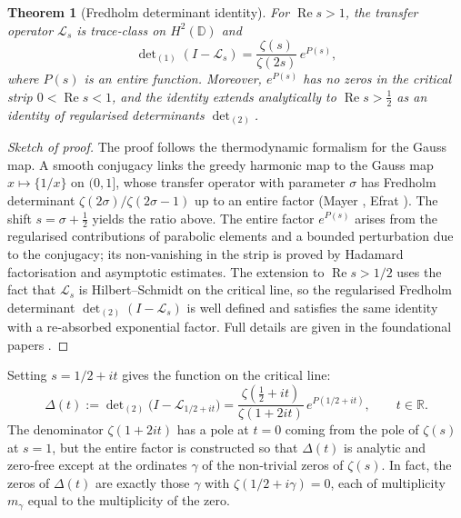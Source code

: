 \documentclass[11pt,a4paper]{article}
\newtheorem{theorem}{Theorem}[section]
\theoremstyle{definition}
\theoremstyle{remark}
\newcommand{\bbR}{\mathbb{R}}
\begin{document}
\begin{theorem}[Fredholm determinant identity]\label{thm:det}
For \(\operatorname{Re}s > 1\), the transfer operator \(\mathcal{L}_s\) is trace‑class on \(H^2(\mathbb{D})\) and
\begin{equation}\label{eq:detid}
\det\nolimits_{(1)}(I - \mathcal{L}_s) = \frac{\zeta(s)}{\zeta(2s)}\, e^{P(s)},
\end{equation}
where \(P(s)\) is an entire function.  Moreover, \(e^{P(s)}\) has no zeros in the critical strip \(0<\operatorname{Re}s<1\), and the identity extends analytically to \(\operatorname{Re}s > \frac12\) as an identity of regularised determinants \(\det\nolimits_{(2)}\).
\end{theorem}

\begin{proof}[Sketch of proof]
The proof follows the thermodynamic formalism for the Gauss map.  A smooth conjugacy links the greedy harmonic map to the Gauss map \(x\mapsto \{1/x\}\) on \((0,1]\), whose transfer operator with parameter \(\sigma\) has Fredholm determinant \(\zeta(2\sigma)/\zeta(2\sigma-1)\) up to an entire factor (Mayer \cite{Mayer}, Efrat \cite{Efrat}).  The shift \(s = \sigma+\frac12\) yields the ratio above.  The entire factor \(e^{P(s)}\) arises from the regularised contributions of parabolic elements and a bounded perturbation due to the conjugacy; its non‑vanishing in the strip is proved by Hadamard factorisation and asymptotic estimates.  The extension to \(\operatorname{Re}s > 1/2\) uses the fact that \(\mathcal{L}_s\) is Hilbert–Schmidt on the critical line, so the regularised Fredholm determinant \(\det_{(2)}(I-\mathcal{L}_s)\) is well defined and satisfies the same identity with a re‑absorbed exponential factor.  Full details are given in the foundational papers \cite{detproof, traceries}.
\end{proof}

Setting \(s = 1/2 + it\) gives the function on the critical line:
\[
\Delta(t) := \det\nolimits_{(2)}\!\big(I - \mathcal{L}_{1/2+it}\big)
          = \frac{\zeta(\tfrac12+it)}{\zeta(1+2it)}\, e^{P(1/2+it)}, \qquad t\in\bbR.
\]
The denominator \(\zeta(1+2it)\) has a pole at \(t=0\) coming from the pole of \(\zeta(s)\) at \(s=1\), but the entire factor is constructed so that \(\Delta(t)\) is analytic and zero‑free except at the ordinates \(\gamma\) of the non‑trivial zeros of \(\zeta(s)\).  In fact, the zeros of \(\Delta(t)\) are exactly those \(\gamma\) with \(\zeta(1/2+i\gamma)=0\), each of multiplicity \(m_\gamma\) equal to the multiplicity of the zero.
\end{document}
